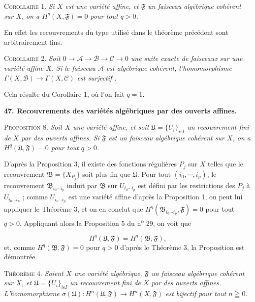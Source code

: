 \textsc{Corollaire} 1. \textit{Si $X$ est une variété affine, et $\mathfrak{F}$ un faisceau algébrique cohérent sur $X$, on a $H^q(X, \mathfrak{F}) = 0$ pour tout $q > 0$.}

En effet les recouvrements du type utilisé dans le théorème précédent sont arbitrairement fins.

\textsc{Corollaire} 2. \textit{Soit $0 \to \mathcal{A} \to \mathcal{B} \to \mathcal{C} \to 0$ une suite exacte de faisceaux sur une variété affine $X$. Si le faisceau $\mathcal{A}$ est algébrique cohérent, l'homomorphisme $\Gamma(X, \mathcal{B}) \to \Gamma(X, \mathcal{C})$ est surjectif .}

Cela résulte du Corollaire 1, où l'on fait $q = 1$.


\textbf{47. Recouvrements des variétés algébriques par des ouverts affines.}

\textsc{Proposition} 8. \textit{Soit $X$ une variété affine, et soit $\mathfrak{U} = \{U_i\}_{i \epsilon I}$ un recouvrement fini de $X$ par des ouverts affines. Si $\mathfrak{F}$ est un faisceau algébrique cohérent sur $X$, on a $H^q(\mathfrak{U}, \mathfrak{F}) = 0$ pour tout $q > 0$.}

D'après la Proposition 3, il existe des fonctions régulières $P_j$ sur $X$ telles que le recouvrement $\mathfrak{B} = \{X_{P_j}\}$ soit plus fin que $\mathfrak{U}$. Pour tout $(i_0 , \cdots , i_p)$, le recouvrement $\mathfrak{B}_{i_0 \cdots i_p}$ induit par $\mathfrak{B}$ sur $U_{i_0 \cdots i_p}$ est défini par les restrictions des $P_j$ à $U_{i_0 \cdots i_p}$ ; comme $U_{i_0 \cdots i_p}$ est une variété affine d'après la Proposition 1, on peut lui appliquer le Théorème 3, et on en conclut que $H^q(\mathfrak{B}_{i_0 \cdots i_p} , \mathfrak{F}) = 0$ pour tout $q > 0$. Appliquant alors la Proposition 5 du n\textsuperscript{o} 29, on voit que

\begin{equation*}
H^q(\mathfrak{U}, \mathfrak{F}) = H^q(\mathfrak{B}, \mathfrak{F}),
\end{equation*}
et, comme $H^q(\mathfrak{B}, \mathfrak{F}) = 0$ pour $q > 0$ d'après le Théorème 3, la Proposition est démontrée.

\textsc{Théorème} 4. \textit{Soient $X$ une variété algébrique, $\mathfrak{F}$ un faisceau algébrique cohérent sur $X$, et $\mathfrak{U} = \{U_i\}_{i \epsilon I}$ un recouvrement fini de $X$ par des ouverts affines. L'homomorphisme $\sigma(\mathfrak{U}) : H^n(\mathfrak{U}, \mathfrak{F}) \to H^n(X, \mathfrak{F})$ est bijectif pour tout $n \geqq 0$.}

